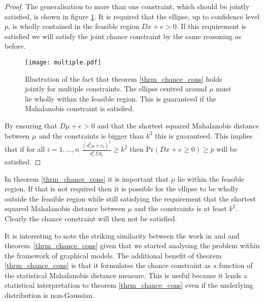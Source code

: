 \begin{proof}
The generalisation to more than one constraint, which should be jointly satisfied, is shown in figure \ref{fig_mahala_ellipse_joint}. It is required that the ellipse, up to confidence level $p$, is wholly contained in the feasible region $Dx +e >0$. If this requirement is satisfied we will satisfy the joint chance constraint by the same reasoning as before.  
\begin{figure}[H] 
\centering
\texttt{[image: multiple.pdf]}
\caption{Illustration of the fact that theorem \ref{thrm_chance_cons} holds jointly for multiple constraints. The ellipse centred around $\mu$ must lie wholly within the feasible region. This is guaranteed if the Mahalanobis constraint is satisfied.}
\label{fig_mahala_ellipse_joint}
\end{figure}
By ensuring that $D\mu + e > 0$ and that the shortest squared Mahalanobis distance between $\mu$ and the constraints is bigger than $k^2$ this is guaranteed. This implies that if for all $i=1,\hdots,n$ $\frac{(d^T_i\mu+e_i)^2}{d_i^T \Sigma d_i} \geq k^2$ then $\text{Pr}(Dx + e \geq 0) \geq p$ will be satisfied.
\end{proof}
In theorem \ref{thrm_chance_cons} it is important that $\mu$ lie within the feasible region. If that is not required then it is possible for the ellipse to be wholly outside the feasible region while still satisfying the requirement that the shortest squared Mahalanobis distance between $\mu$ and the constraints is at least $k^2$. Clearly the chance constraint will then not be satisfied. 

It is interesting to note the striking similarity between the work in \cite{vanhessem1} and \cite{vanhessem2} and theorem~\ref{thrm_chance_cons} given that we started analysing the problem within the framework of graphical models. The additional benefit of theorem \ref{thrm_chance_cons} is that it formulates the chance constraint as a function of the statistical Mahalanobis distance measure. This is useful because it lends a statistical interpretation to theorem \ref{thrm_chance_cons} even if the underlying distribution is non-Gaussian.

